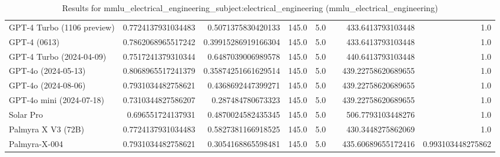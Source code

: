 \begin{table}[htp]
{\begin{tabular}{lrrrrrrr}
GPT-4 Turbo (1106 preview) & 0.7724137931034483 & 0.5071375830420133 & 145.0 & 5.0 &  & 433.6413793103448 & 1.0 \\
GPT-4 (0613) & 0.7862068965517242 & 0.39915286919166304 & 145.0 & 5.0 &  & 433.6413793103448 & 1.0 \\
GPT-4 Turbo (2024-04-09) & 0.7517241379310344 & 0.6487039006989578 & 145.0 & 5.0 &  & 440.6413793103448 & 1.0 \\
GPT-4o (2024-05-13) & 0.8068965517241379 & 0.35874251661629514 & 145.0 & 5.0 &  & 439.22758620689655 & 1.0 \\
GPT-4o (2024-08-06) & 0.7931034482758621 & 0.4368692447399271 & 145.0 & 5.0 &  & 439.22758620689655 & 1.0 \\
GPT-4o mini (2024-07-18) & 0.7310344827586207 & 0.287484780673323 & 145.0 & 5.0 &  & 439.22758620689655 & 1.0 \\
Solar Pro & 0.696551724137931 & 0.4870024582435345 & 145.0 & 5.0 &  & 506.7793103448276 & 1.0 \\
Palmyra X V3 (72B) & 0.7724137931034483 & 0.5827381166918525 & 145.0 & 5.0 &  & 430.3448275862069 & 1.0 \\
Palmyra-X-004 & 0.7931034482758621 & 0.3054168865598481 & 145.0 & 5.0 &  & 435.60689655172416 & 0.993103448275862 \\
\bottomrule
\end{tabular}}
\caption{Results for mmlu_electrical_engineering_subject:electrical_engineering (mmlu_electrical_engineering)}
\label{fig:mmlu_electrical_engineering_subject:electrical_engineering (mmlu_electrical_engineering)}
\end{table}